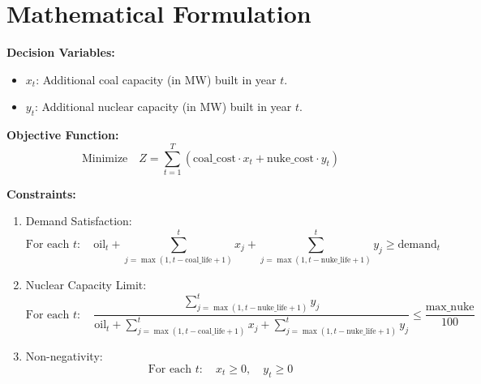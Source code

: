 \documentclass{article}
\begin{document}
\section*{Mathematical Formulation}

\textbf{Decision Variables:}
\begin{itemize}
    \item \( x_t \): Additional coal capacity (in MW) built in year \( t \).
    \item \( y_t \): Additional nuclear capacity (in MW) built in year \( t \).
\end{itemize}

\textbf{Objective Function:}
\[
\text{Minimize} \quad Z = \sum_{t=1}^{T} (\text{coal\_cost} \cdot x_t + \text{nuke\_cost} \cdot y_t)
\]

\textbf{Constraints:}
\begin{enumerate}
    \item Demand Satisfaction:
    \[
    \text{For each } t: \quad \text{oil}_t + \sum_{j=\max(1, t-\text{coal\_life}+1)}^{t} x_j + \sum_{j=\max(1, t-\text{nuke\_life}+1)}^{t} y_j \geq \text{demand}_t
    \]
    \item Nuclear Capacity Limit:
    \[
    \text{For each } t: \quad \frac{\sum_{j=\max(1, t-\text{nuke\_life}+1)}^{t} y_j}{\text{oil}_t + \sum_{j=\max(1, t-\text{coal\_life}+1)}^{t} x_j + \sum_{j=\max(1, t-\text{nuke\_life}+1)}^{t} y_j} \leq \frac{\text{max\_nuke}}{100}
    \]
    \item Non-negativity:
    \[
    \text{For each } t: \quad x_t \geq 0, \quad y_t \geq 0
    \]
\end{enumerate}
\end{document}
